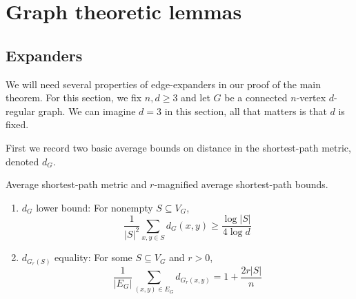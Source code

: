 \section{Graph theoretic lemmas}

\subsection{Expanders}

We will need several properties of edge-expanders in our proof of the main theorem. 
For this section, we fix $n, d \geq 3$ and let $G$ be a connected $n$-vertex $d$-regular graph.
We can imagine $d = 3$ in this section, all that matters is that $d$ is fixed. 

First we record two basic average bounds on distance in the shortest-path metric, denoted $d_G$.
\begin{lem} Average shortest-path metric and $r$-magnified average shortest-path bounds. \\
\begin{enumerate}

\item $d_G$ lower bound: For nonempty $S \subseteq V_G$,
\[
\frac{1}{|S|^2}\sum_{x, y \in S}d_G(x, y) \geq \frac{\log |S|}{4\log d}
\]

\item $d_{G_r(S)}$ equality: For some $S \subseteq V_G$ and $r > 0$, 
\[
\frac{1}{|E_G|}\sum_{(x, y ) \in E_G} d_{G_r(x, y)} = 1 + \frac{2r|S|}{n}
\]

\end{enumerate}
\end{lem}
